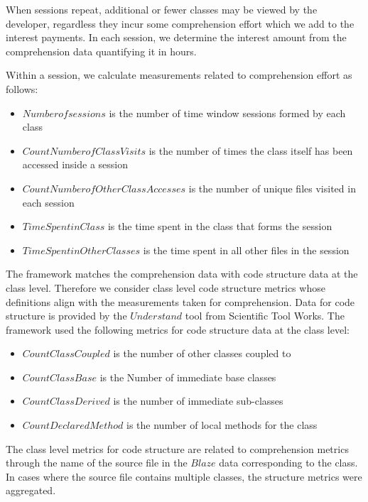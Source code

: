 When sessions repeat, additional or fewer classes may be viewed by the developer, regardless they incur some comprehension effort which we add to the interest payments.  In each session, we determine the interest amount from the comprehension data quantifying it in hours. 


Within a session, we calculate measurements related to comprehension effort as follows:
\begin{itemize}
	\item[] $Number of sessions$ is the number of time window sessions formed by each class 
	\item[] $Count Number of Class Visits$ is the number of times the class itself has been accessed inside a session 
	\item[] $Count Number of Other Class Accesses$ is the number of unique files visited in each session
	\item[] $Time Spent in Class$ is the time spent in the class that forms the session
	\item[] $Time Spent in Other Classes$ is the time spent in all other files in the session
\end{itemize}

  

The framework matches the comprehension data with code structure data at the class level.  Therefore we consider class level code structure metrics whose definitions align with the measurements taken for comprehension.  Data for code structure is provided by the $Understand$ tool from Scientific Tool Works.  The framework used the following metrics for code structure data at the class level:

\begin{itemize}
	\item[] $Count Class Coupled$ is the number of other classes coupled to
	\item[] $Count Class Base$ is the Number of immediate base classes
	\item[] $Count Class Derived$ is the number of immediate sub-classes
	\item[] $Count Declared Method$ is the number of local methods for the class
\end{itemize}

The class level metrics for code structure are related to comprehension metrics through the name of the source file in the $Blaze$ data corresponding to the class.  In cases where the source file contains multiple classes, the structure metrics were aggregated.

